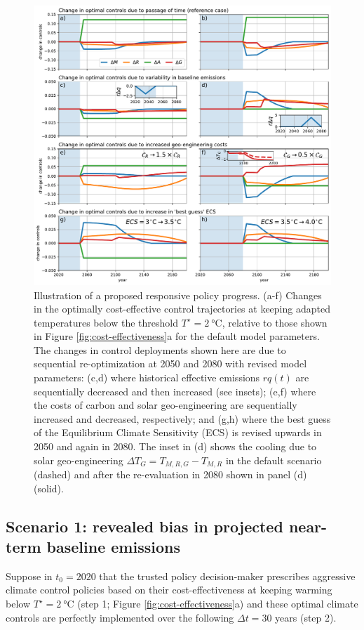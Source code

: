 \documentclass[9pt,twocolumn,twoside,lineno]{pnas-new}
\begin{document}
\begin{figure}%
\centering
\includegraphics[width=11.4cm]{figures/policy_updates.pdf}
\caption{Illustration of a proposed responsive policy progress. (a-f) Changes in the optimally cost-effective control trajectories at keeping adapted temperatures below the threshold $T^{\star} = \SI{2}{\celsius}$, relative to those shown in Figure \ref{fig:cost-effectiveness}a for the default model parameters. The changes in control deployments shown here are due to sequential re-optimization at 2050 and 2080 with revised model parameters: (c,d) where historical effective emissions $rq(t)$ are sequentially decreased and then increased (see insets); (e,f) where the costs of carbon and solar geo-engineering are sequentially increased and decreased, respectively; and (g,h) where the best guess of the Equilibrium Climate Sensitivity (ECS) is revised upwards in 2050 and again in 2080. The inset in (d) shows the cooling due to solar geo-engineering $\Delta T_{G} = T_{M,R,G} - T_{M,R}$ in the default scenario (dashed) and after the re-evaluation in 2080 shown in panel (d) (solid).}
\label{fig:policy-updates}
\end{figure}

\subsection*{Scenario 1: revealed bias in projected near-term baseline emissions}

Suppose in $t_{0} = 2020$ that the trusted policy decision-maker prescribes aggressive climate control policies based on their cost-effectiveness at keeping warming below $T^{\star} = \SI{2}{\celsius}$ (step 1; Figure \ref{fig:cost-effectiveness}a) and these optimal climate controls are perfectly implemented over the following $\Delta t = 30$ years (step 2).
\end{document}
